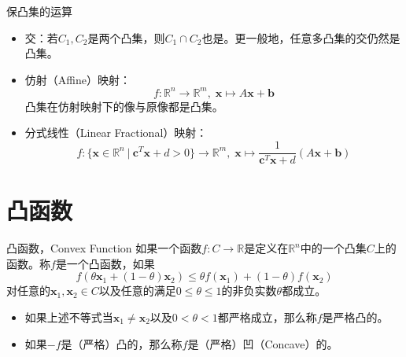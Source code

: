 \begin{frame}

\begin{block}{保凸集的运算}
\begin{itemize}
\item 交：若$C_1,C_2$是两个凸集，则$C_1\cap C_2$也是。更一般地，任意多凸集的交仍然是凸集。
\item 仿射（Affine）映射：
\[f: \mathbb{R}^n \to \mathbb{R}^m, \; \mathbf{x} \mapsto A\mathbf{x} + \mathbf{b}\]
凸集在仿射映射下的像与原像都是凸集。
\item 分式线性（Linear Fractional）映射：
\[f: \{ \mathbf{x} \in \mathbb{R}^n \ |\ \mathbf{c}^T\mathbf{x} + d > 0 \} \to \mathbb{R}^m, \; \mathbf{x} \mapsto \dfrac{1}{\mathbf{c}^T\mathbf{x} + d}(A\mathbf{x} + \mathbf{b})\]
\end{itemize}

\end{block}

\end{frame}







\section{凸函数}


\begin{frame}

\begin{block}{凸函数，Convex Function}
如果一个函数$f: C\to \mathbb{R}$是定义在$\mathbb{R}^n$中的一个凸集$C$上的函数。称$f$是一个凸函数，如果
\[f(\theta\mathbf{x}_1 + (1-\theta)\mathbf{x}_2) \le \theta f(\mathbf{x}_1) + (1-\theta)f(\mathbf{x}_2)\]
对任意的$\mathbf{x}_1, \mathbf{x}_2 \in C$以及任意的满足$0\le\theta\le1$的非负实数$\theta$都成立。
\begin{itemize}
\item 如果上述不等式当$\mathbf{x}_1 \neq \mathbf{x}_2$以及$0<\theta<1$都严格成立，那么称$f$是严格凸的。
\item 如果$-f$是（严格）凸的，那么称$f$是（严格）凹（Concave）的。
\end{itemize}
\end{block}

\end{frame}

